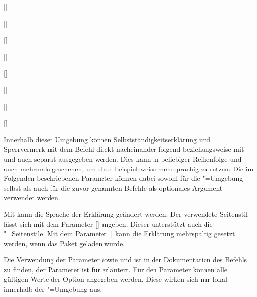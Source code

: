 \begin{Declaration}[v2.02]{\LParameter}
\begin{Declaration}{[]}
\begin{Declaration}[v2.02]{%
  []%
}
\begin{Declaration}[v2.02]{%
  []%
}
\begin{Declaration}{[\PSet]}
\begin{Declaration}{%
  []
}
\begin{Declaration}{[]}
\begin{Declaration}{[]}
\begin{Declaration}{[]}

\printdeclarationlist%
%
%
Innerhalb dieser Umgebung können Selbstständigkeitserklärung und Sperrvermerk 
mit dem Befehl  direkt nacheinander folgend beziehungsweise 
mit  und  auch separat ausgegeben werden. 
Dies kann in beliebiger Reihenfolge und auch mehrmals geschehen, um diese 
beispielsweise mehrsprachig zu setzen. Die im Folgenden beschriebenen Parameter 
können dabei sowohl für die "=Umgebung selbst als 
auch für die zuvor genannten Befehle als optionales Argument verwendet werden.

Mit  kann die Sprache der Erklärung 
geändert werden. Der verwendete Seitenstil lässt sich mit dem Parameter 
[] angeben. 
Dieser unterstützt auch die "=Seitenstile. Mit dem 
Parameter [] kann die 
Erklärung mehrspaltig gesetzt werden, wenn das Paket  geladen 
wurde.

Die Verwendung der Parameter  sowie
 und  ist 
in der Dokumentation des Befehls  zu finden, der Parameter 
 ist für  erläutert. Für den 
Parameter  können alle gültigen Werte 
der Option  angegeben werden. Diese wirken sich nur lokal 
innerhalb der "=Umgebung aus.
\end{Declaration}
\end{Declaration}
\end{Declaration}
\end{Declaration}
\end{Declaration}
\end{Declaration}
\end{Declaration}
\end{Declaration}
\end{Declaration}
